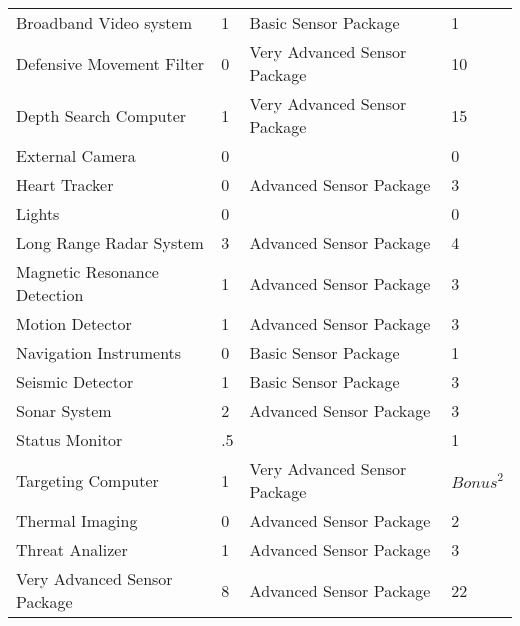 \documentclass[twoside]{book}
\begin{document}
\begin{longtable}{p{1.25in}lll}
      \raggedright Broadband Video system&1&Basic Sensor Package&1\tabularnewline
      \raggedright Defensive Movement Filter&0&Very Advanced Sensor Package&10\tabularnewline
      \raggedright Depth Search Computer&1&Very Advanced Sensor Package&15\tabularnewline
      \raggedright External Camera&0&&0\tabularnewline
      \raggedright Heart Tracker&0&Advanced Sensor Package&3\tabularnewline
      \raggedright Lights&0&&0\tabularnewline
      \raggedright Long Range Radar System&3&Advanced Sensor Package&4\tabularnewline
      \raggedright Magnetic Resonance Detection&1&Advanced Sensor Package&3\tabularnewline
      \raggedright Motion Detector&1&Advanced Sensor Package&3\tabularnewline
      \raggedright Navigation Instruments&0&Basic Sensor Package&1\tabularnewline
      \raggedright Seismic Detector&1&Basic Sensor Package&3\tabularnewline
      \raggedright Sonar System&2&Advanced Sensor Package&3\tabularnewline
      \raggedright Status Monitor&.5&&1\tabularnewline
      \raggedright Targeting Computer&1&Very Advanced Sensor Package&\begin{math}{Bonus}^{2}\end{math}\tabularnewline
      \raggedright Thermal Imaging&0&Advanced Sensor Package&2\tabularnewline
      \raggedright Threat Analizer&1&Advanced Sensor Package&3\tabularnewline
      \raggedright Very Advanced Sensor Package&8&Advanced Sensor Package&22\tabularnewline
      
\end{longtable}
    
\end{document}
